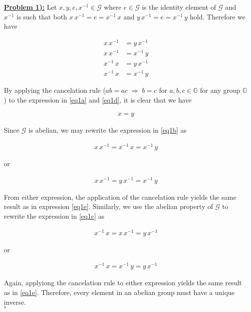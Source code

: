 \documentclass{article}[12]
\numberwithin{equation}{section}
\newcommand{\numbpr}[1]{\setcounter{section}{#1} \setcounter{equation}{0}}
\newcommand{\prob}[1]{\textbf{\underline{Problem #1):}}}
\begin{document}
\begin{flushleft}



\numbpr{1}
\prob{1} Let $x, y, e, x^{-1} \in \mathcal{G}$ where $e \in \mathcal{G}$ is the identity element of $\mathcal{G}$ and $x^{-1}$ is such that both $x \, x^{-1} = e = x^{-1} \, x$ and $y \, x^{-1} = e = x^{-1} \, y$ hold.  Therefore we have 

\begin{align}
  x \, x^{-1} &= y \, x^{-1} \label{eq1a} \\
  x \, x^{-1} &= x^{-1} \, y \label{eq1b} \\
  x^{-1} \, x &= y \, x^{-1} \label{eq1c} \\
  x^{-1} \, x &= x^{-1} \, y \label{eq1d} 
\end{align}

By applying the cancelation rule ($a b = a c \; \Rightarrow \; b = c$ for $a, b, c \in \mathbb{G}$ for any group $\mathbb{G}$) to the expression in \ref{eq1a} and \ref{eq1d}, it is clear that we have

\begin{align}
  x = y \label{eq1e}
\end{align}

Since $\mathcal{G}$ is abelian, we may rewrite the expression in \ref{eq1b} as

\begin{align*}
  x \, x^{-1} = x^{-1} \, x = x^{-1} \, y
\end{align*}

or

\begin{align*}
  x \, x^{-1} = y \, x^{-1} = x^{-1} \, y
\end{align*}

From either expression, the application of the cancelation rule yields the same result as in expression \ref{eq1e}.  Similarly, we use the abelian property of $\mathcal{G}$ to rewrite the expression in \ref{eq1c} as

\begin{align*}
  x^{-1} \, x = x \, x^{-1} = y \, x^{-1}
\end{align*}

or

\begin{align*}
  x^{-1} \, x = x^{-1} \, y = y \, x^{-1}
\end{align*}

Again, applyiong the cancelation rule to either expression yields the same result as in \ref{eq1e}.  Therefore, every element in an abelian group must have a unique inverse. \\
$\square$




\end{flushleft}
\end{document}
